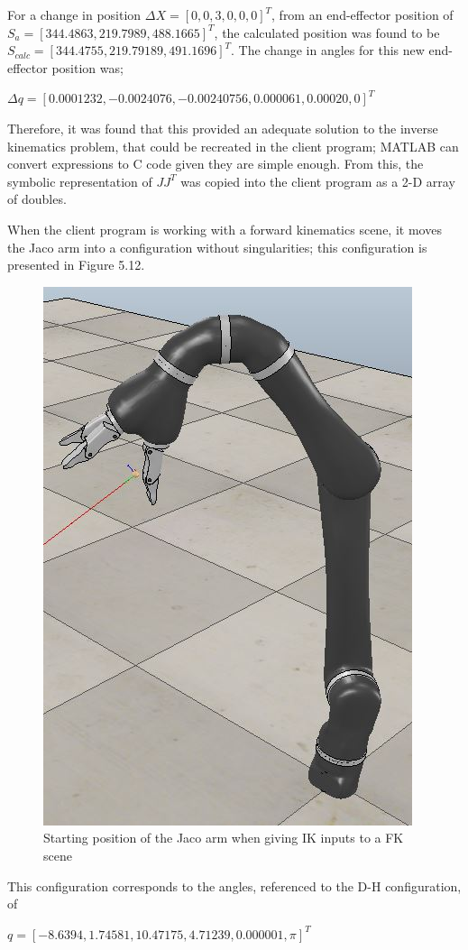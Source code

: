 \documentclass[12pt,openany,a4paper]{book}
\begin{document}
For a change in position $\Delta X = [0, 0, 3, 0, 0, 0]^T$, from an end-effector position of $S_a = [344.4863, 219.7989, 488.1665]^T$, the calculated position was found to be $S_{calc} = [ 344.4755, 219.79189, 491.1696]^T$. The change in angles for this new end-effector position was;

\begin{center}
$\Delta q = [0.0001232, -0.0024076, -0.00240756, 0.000061, 0.00020, 0]^T$
\end{center}

Therefore, it was found that this provided an adequate solution to the inverse kinematics problem, that could be recreated in the client program; MATLAB can convert expressions to C code given they are simple enough. From this, the symbolic representation of $J J^T$ was copied into the client program as a 2-D array of doubles. 

When the client program is working with a forward kinematics scene, it moves the Jaco arm into a configuration without singularities; this configuration is presented in Figure 5.12.

\begin{center}
\begin{figure}[htb]
  \includegraphics[width=0.5\linewidth]{jaco_start_config.jpg}
\caption{ Starting position of the Jaco arm when giving IK inputs to a FK scene }
\end{figure}
\end{center}

This configuration corresponds to the angles, referenced to the D-H configuration, of

\begin{center}
$q = [-8.6394, 1.74581, 10.47175, 4.71239, 0.000001, \pi]^T$
\end{center}
\end{document}

